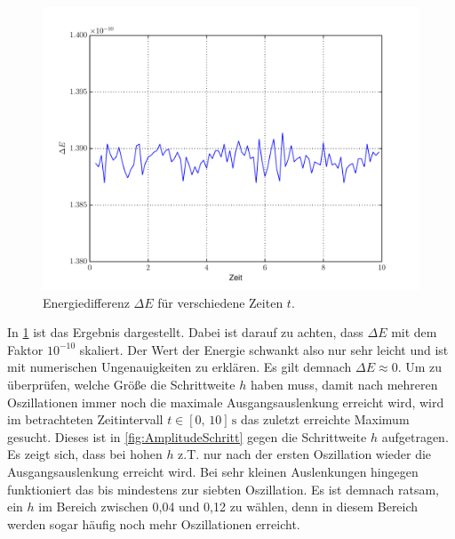 \begin{figure}[h]
	\centering
	\includegraphics[width = \textwidth]{../Plots/Plot_2_B_Energie.pdf}
	\caption{Energiedifferenz $\Delta E$ für verschiedene Zeiten $t$.\label{fig:EnergieDiff}}
\end{figure}
In \cref{fig:EnergieDiff} ist das Ergebnis dargestellt. Dabei ist darauf zu achten, dass $\Delta E$ mit dem Faktor $10^{-10}$ skaliert.
Der Wert der Energie schwankt also nur sehr leicht und ist mit numerischen Ungenauigkeiten zu erklären.
Es gilt demnach $\Delta E\approx 0$.
\newpage
Um zu überprüfen, welche Größe die Schrittweite $h$ haben muss, damit nach mehreren Oszillationen immer noch die maximale Ausgangsauslenkung erreicht wird, wird im betrachteten Zeitintervall $t\in[0,\,10]\,\text{s}$ das zuletzt erreichte Maximum gesucht.
Dieses ist in \cref{fig:AmplitudeSchritt} gegen die Schrittweite $h$ aufgetragen.
Es zeigt sich, dass bei hohen $h$ z.T. nur nach der ersten Oszillation wieder die Ausgangsauslenkung erreicht wird.
Bei sehr kleinen Auslenkungen hingegen funktioniert das bis mindestens zur siebten Oszillation.
Es ist demnach ratsam, ein $h$ im Bereich zwischen 0,04 und 0,12 zu wählen, denn in diesem Bereich werden sogar häufig noch mehr Oszillationen erreicht.

